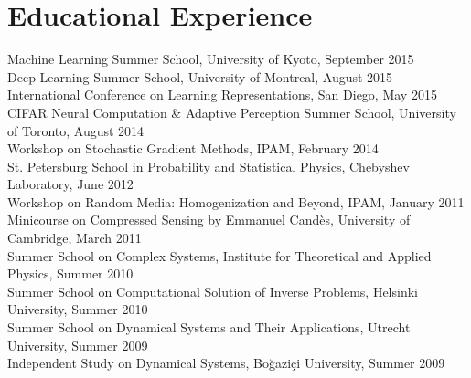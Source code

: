 \documentclass[10pt,letterpaper]{article}
\renewenvironment{itemize}
{
\begin{list}{}{\setlength{\leftmargin}{1.5em}}
}
{
  \end{list}
}
\begin{document}
\section*{Educational Experience}
\begin{itemize}
\item Machine Learning Summer School, University of Kyoto, September 2015 \\ 
Deep Learning Summer School, University of Montreal, August 2015 \\ 
International Conference on Learning Representations, San Diego, May 2015 \\ 
CIFAR Neural Computation \& Adaptive Perception Summer School, University of Toronto, August 2014 \\ 
Workshop on Stochastic Gradient Methods, IPAM, February 2014 \\ 
St. Petersburg School in Probability and Statistical Physics, Chebyshev Laboratory, June 2012 \\ 
Workshop on Random Media: Homogenization and Beyond, IPAM, January 2011 \\ 
Minicourse on Compressed Sensing by Emmanuel Cand\`{e}s, University of Cambridge, March 2011 \\ 
Summer School on Complex Systems, Institute for Theoretical and Applied Physics, Summer 2010 \\ 
Summer School on Computational Solution of Inverse Problems, Helsinki University, Summer 2010 \\ 
Summer School on Dynamical Systems and Their Applications, Utrecht University, Summer 2009 \\ 
Independent Study on Dynamical Systems, Bo\u{g}azi\c{c}i University, Summer 2009 
\end{itemize}

\end{document}
